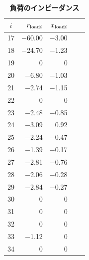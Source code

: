 \documentclass[tombow,dvipdfmx]{corona-a5-1.1}
\begin{document}
\begin{table}[h]
\medskip
\caption{\textbf{負荷のインピーダンス}} \label{table:ieee68loads}
 \centering
  {
  \begin{minipage}{0.32\linewidth}
    \centering
  \begin{tabular}{crrcc}
   \hline
$i$ & $r_{{\rm load}i}$  &  $x_{{\rm load}i}$ \\
   \hline \hline
\multicolumn{1}{c}{17}  & \multicolumn{1}{r}{$-$60.00} & \multicolumn{1}{r}{$-$3.00} \\
\multicolumn{1}{c}{18}  & \multicolumn{1}{r}{$-$24.70} & \multicolumn{1}{r}{$-$1.23}  \\
\multicolumn{1}{c}{19}  & \multicolumn{1}{r}{0} & \multicolumn{1}{r}{0}  \\
\multicolumn{1}{c}{20}  & \multicolumn{1}{r}{$-$6.80} & \multicolumn{1}{r}{$-$1.03}  \\
\multicolumn{1}{c}{21}  & \multicolumn{1}{r}{$-$2.74} & \multicolumn{1}{r}{$-$1.15}  \\
\multicolumn{1}{c}{22}  & \multicolumn{1}{r}{0} & \multicolumn{1}{r}{0}  \\
\multicolumn{1}{c}{23}  & \multicolumn{1}{r}{$-$2.48} & \multicolumn{1}{r}{$-$0.85} \\
\multicolumn{1}{c}{24}  & \multicolumn{1}{r}{$-$3.09} & \multicolumn{1}{r}{0.92} \\
\multicolumn{1}{c}{25}  & \multicolumn{1}{r}{$-$2.24} & \multicolumn{1}{r}{$-$0.47} \\
\multicolumn{1}{c}{26}  & \multicolumn{1}{r}{$-$1.39} & \multicolumn{1}{r}{$-$0.17}  \\
\multicolumn{1}{c}{27}  & \multicolumn{1}{r}{$-$2.81} & \multicolumn{1}{r}{$-$0.76} \\
\multicolumn{1}{c}{28}  & \multicolumn{1}{r}{$-$2.06} & \multicolumn{1}{r}{$-$0.28}  \\
\multicolumn{1}{c}{29}  & \multicolumn{1}{r}{$-$2.84} & \multicolumn{1}{r}{$-$0.27}  \\
\multicolumn{1}{c}{30}  & \multicolumn{1}{r}{0} & \multicolumn{1}{r}{0} \\
\multicolumn{1}{c}{31}  & \multicolumn{1}{r}{0} & \multicolumn{1}{r}{0} \\
\multicolumn{1}{c}{32}  & \multicolumn{1}{r}{0} & \multicolumn{1}{r}{0} \\
\multicolumn{1}{c}{33}  & \multicolumn{1}{r}{$-$1.12} & \multicolumn{1}{r}{0} \\
\multicolumn{1}{c}{34}  & \multicolumn{1}{r}{0} & \multicolumn{1}{r}{0} \\

\end{tabular}
\end{minipage}}
\end{table}
\end{document}
